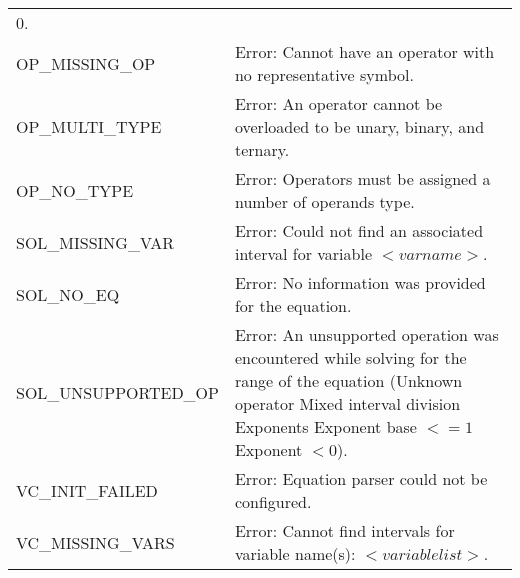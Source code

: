 \documentclass[12pt, titlepage]{article}
\begin{document}
\begin{longtable}{l p{9.5cm}}
	0.\\
	OP\_MISSING\_OP & Error: Cannot have an operator with no representative symbol. \\
	OP\_MULTI\_TYPE & Error: An operator cannot be overloaded to be unary, 
	binary, and ternary. \\
	OP\_NO\_TYPE & Error: Operators must be assigned a number of operands type. 
	\\
	SOL\_MISSING\_VAR & Error: Could not find an associated interval for 
	variable $<varname>$. \\
	SOL\_NO\_EQ & Error: No information was provided for the equation. \\
	SOL\_UNSUPPORTED\_OP & Error: An unsupported operation was encountered 
	while solving for the range of the equation (Unknown operator \textbar 
	Mixed interval division \textbar Exponents \textbar Exponent base $<= 1$ 
	\textbar Exponent $< 0$).\\
	VC\_INIT\_FAILED & Error: Equation parser could not be configured. \\
	VC\_MISSING\_VARS & Error: Cannot find intervals for variable name(s): 
	$<variable list>$. \\
	\bottomrule
\end{longtable}
\end{document}
